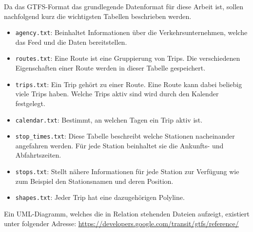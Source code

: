 \begin{newpage}
		Da das GTFS-Format das grundlegende Datenformat für diese Arbeit ist, sollen nachfolgend kurz die wichtigsten Tabellen beschrieben werden.

		\begin{itemize}
			\item \texttt{agency.txt}: Beinhaltet Informationen über die Verkehrsunternehmen, welche das Feed und die Daten bereitstellen.

			\item \texttt{routes.txt}: Eine Route ist eine Gruppierung von Trips. Die verschiedenen Eigenschaften einer Route werden in dieser Tabelle gespeichert.

			\item \texttt{trips.txt}: Ein Trip gehört zu einer Route. Eine Route kann dabei beliebig viele Trips haben. Welche Trips aktiv sind wird durch den Kalender festgelegt.

			\item \texttt{calendar.txt}: Bestimmt, an welchen Tagen ein Trip aktiv ist.

			\item \texttt{stop\_times.txt}: Diese Tabelle beschreibt welche Stationen nacheinander angefahren werden. Für jede Station beinhaltet sie die Ankunfts- und Abfahrtszeiten.

			\item \texttt{stops.txt}: Stellt nähere Informationen für jede Station zur Verfügung wie zum Beispiel den Stationsnamen und deren Position.

			\item \texttt{shapes.txt}: Jeder Trip hat eine dazugehörigen Polyline.

		\end{itemize}

  Ein UML-Diagramm, welches die in Relation stehenden Dateien aufzeigt, existiert unter folgender Adresse: \url{https://developers.google.com/transit/gtfs/reference/} 

\end{newpage}

